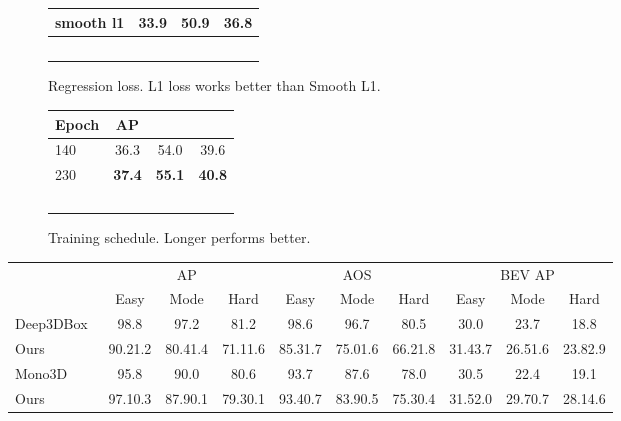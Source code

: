\documentclass[10pt,twocolumn,letterpaper]{article}
\begin{document}
\begin{table*}[t]
\begin{subfigure}[t]{0.23\linewidth}
\begin{tabular}{l c c c}
smooth l1 & 33.9 & 50.9 & 36.8 \\
\hline
\multicolumn{4}{c}{~}\\
\end{tabular}
\caption{Regression loss. L1 loss works better than Smooth L1.}
\label{tab:design:regloss}
\end{subfigure}
\hspace{2mm}
\begin{subfigure}[t]{0.2\linewidth}
\centering
\begin{tabular}{l c c c}
\hline
Epoch & AP &  &  \\
\hline
140& 36.3 & 54.0 & 39.6 \\
230& \textbf{37.4} & \textbf{55.1} & \textbf{40.8} \\
\hline
\multicolumn{4}{c}{~}\\
\end{tabular}
\caption{Training schedule. Longer performs better.}
\label{tab:design:schedule}
\end{subfigure}
\vspace{-0.5em}
\caption{Ablation of design choices on COCO validation set. The results are shown in COCO AP, time in milliseconds.}
\label{tab:design}
\vspace{-1.5em}
\setlength{\tabcolsep}{2pt}
\end{table*}


\begin{table*}[!hb]
\centering
\begin{tabular}{l c@{\ \ } c@{\ \ } c@{\ \ } c@{\ \ } c@{\ \ } c@{\ \ } c@{\ \ } c@{\ \ } c}
\hline
& \multicolumn{3}{c}{AP} & \multicolumn{3}{c}{AOS} & \multicolumn{3}{c}{BEV AP} \\
 & Easy & Mode & Hard & Easy & Mode & Hard & Easy & Mode & Hard \\
\hline
Deep3DBox~\cite{mousavian20173d} & 98.8 & 97.2 & 81.2 & 98.6 & 96.7 & 80.5 & 30.0 & 23.7 & 18.8 \\
Ours & 90.21.2 & 80.41.4 & 71.11.6 & 85.31.7 & 75.01.6 & 66.21.8 & 31.43.7 & 26.51.6 & 23.82.9 \\
\hline
Mono3D~\cite{chen2016monocular} & 95.8 & 90.0 & 80.6 & 93.7 & 87.6 & 78.0 & 30.5 & 22.4 & 19.1 \\
Ours & 97.10.3 & 87.90.1 & 79.30.1 & 93.40.7 & 83.90.5 & 75.30.4 & 31.52.0 & 29.70.7 & 28.14.6 \\
\hline
\end{tabular}
\vspace{-0.5em}
\caption{KITTI evaluation. We show 2D bounding box AP, average orientation score (AOS), and bird eye view (BEV) AP  on different validation splits. Higher is better.}
\label{tab:kittival}
\vspace{-0.5em}
\end{table*}
\end{document}
